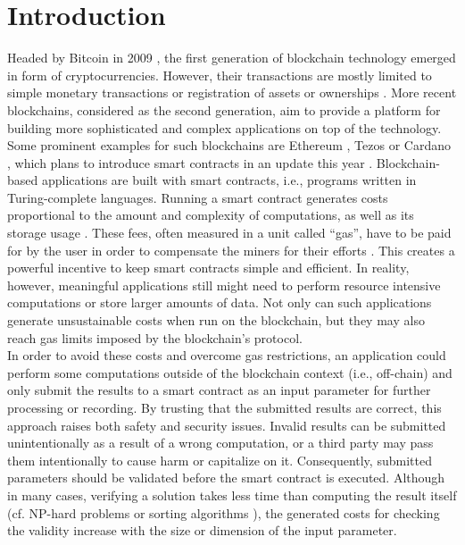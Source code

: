 \chapter{Introduction}\label{chap:introduction}
Headed by Bitcoin in 2009 \cite{bitcoin-whitepaper}, the first generation of blockchain technology emerged in form of cryptocurrencies. However, their transactions are mostly limited to simple monetary transactions or registration of assets or ownerships \cite{alharby_blockchain_2017}. More recent blockchains, considered as the second generation, aim to provide a platform for building more sophisticated and complex applications on top of the technology. Some prominent examples for such blockchains are Ethereum \cite{eth-whitepaper}, Tezos \cite{goodman_tezos_2014} or Cardano \cite{cardano_essay}, which plans to introduce smart contracts in an update this year \cite{cardano_alonzo}. Blockchain-based applications are built with smart contracts, i.e., programs written in Turing-complete languages. Running a smart contract generates costs proportional to the amount and complexity of computations, as well as its storage usage \cite{alharby_blockchain_2017}. These fees, often measured in a unit called ``gas'', have to be paid for by the user in order to compensate the miners for their efforts \cite{narayanan_bitcoin}. This creates a powerful incentive to keep smart contracts simple and efficient. In reality, however, meaningful applications still might need to perform resource intensive computations or store larger amounts of data. Not only can such applications generate unsustainable costs when run on the blockchain, but they may also reach gas limits imposed by the blockchain's protocol. \\
In order to avoid these costs and overcome gas restrictions, an application could perform some computations outside of the blockchain context (i.e., off-chain) and only submit the results to a smart contract as an input parameter for further processing or recording. By trusting that the submitted results are correct, this approach raises both safety and security issues. Invalid results can be submitted unintentionally as a result of a wrong computation, or a third party may pass them intentionally to cause harm or capitalize on it. Consequently, submitted parameters should be validated before the smart contract is executed. Although in many cases, verifying a solution takes less time than computing the result itself (cf. NP-hard problems \cite{nph_problems} or sorting algorithms \cite{review_sorting}\cite{cpp_issorted}), the generated costs for checking the validity increase with the size or dimension of the input parameter. \\
